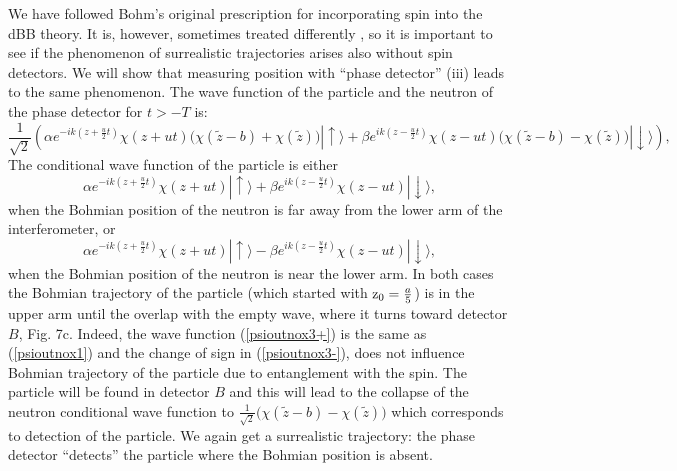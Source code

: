\documentclass[12pt,preprint,tightenlines]{elsarticle}
\begin{document}
We have followed Bohm's original prescription for incorporating spin
into the dBB theory. It is, however, sometimes treated differently \cite{DewdneyHKV},
 so it is important to see if the phenomenon of surrealistic trajectories
arises also without spin detectors. We will show that measuring position
with ``phase detector'' (iii) leads to the same phenomenon. The
wave function of the particle and the neutron of the phase detector
for $t>-T$ is:
 \begin{equation}
\frac{1}{\sqrt{2}}\left(\alpha e^{-ik(z+\frac{u}{2}t)}\chi(z+ut)\Big(\chi(\tilde{z}-b)+\chi(\tilde{z})\Big )|\uparrow\rangle+\beta e^{ik(z-\frac{u}{2}t)}\chi(z-ut)\Big(\chi(\tilde{z}-b)-\chi(\tilde{z})\Big )|\downarrow\rangle\right),\label{psioutnox3}
\end{equation}
 The conditional wave function of the particle is either
  \begin{equation}
\alpha e^{-ik(z+\frac{u}{2}t)}\chi(z+ut)|\uparrow\rangle+\beta e^{ik(z-\frac{u}{2}t)}\chi(z-ut)|\downarrow\rangle,\label{psioutnox3+}
\end{equation}
 when the Bohmian position of the neutron is far away from the lower arm of the interferometer, or
  \begin{equation}
\alpha e^{-ik(z+\frac{u}{2}t)}\chi(z+ut)|\uparrow\rangle-\beta e^{ik(z-\frac{u}{2}t)}\chi(z-ut)|\downarrow\rangle,\label{psioutnox3-}
\end{equation}
 when the Bohmian position of the neutron is near the lower arm. In both cases
the Bohmian trajectory of the particle (which started with ${\rm z_{0}}=\frac{a}{5}$)
is in the upper arm  until the overlap with the empty wave, where it turns
toward detector $B$, Fig. 7c. Indeed, the wave function (\ref{psioutnox3+})
is the same as (\ref{psioutnox1}) and the change of sign in (\ref{psioutnox3-}),
does not influence Bohmian trajectory of the particle due to entanglement
with the spin. The particle will be found in detector $B$ and this
will lead to the collapse of the neutron conditional
wave function  to $ \frac{1}{\sqrt{2}}\Big(\chi(\tilde{z}-b)-\chi(\tilde{z})\Big)$
which corresponds to detection of the particle. We again get a surrealistic
trajectory: the phase detector ``detects'' the particle where
the Bohmian position is absent.
\end{document}
